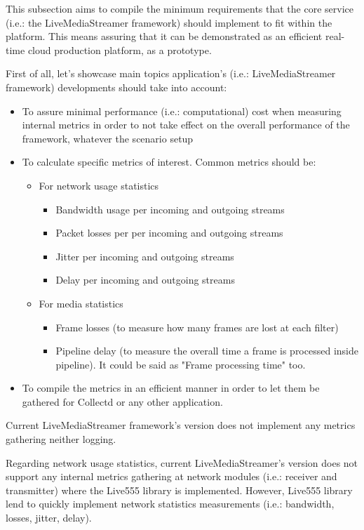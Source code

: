 This subsection aims to compile the minimum requirements that the core service (i.e.: the LiveMediaStreamer framework) should implement to fit within the platform. This means assuring that it can be demonstrated as an efficient real-time cloud production platform, as a prototype.

First of all, let's showcase main topics application's (i.e.: LiveMediaStreamer framework) developments should take into account:

\begin{itemize}
	\item To assure minimal performance (i.e.: computational) cost when measuring internal metrics in order to not take effect on the overall performance of the framework, whatever the scenario setup
	\item To calculate specific metrics of interest. Common metrics should be:
	\begin{itemize}
		\item For network usage statistics
		\begin{itemize}
			\item Bandwidth usage per incoming and outgoing streams
			\item Packet losses per per incoming and outgoing streams
			\item Jitter per incoming and outgoing streams
			\item Delay per incoming and outgoing streams
		\end{itemize}
		\item For media statistics
		\begin{itemize}
			\item Frame losses (to measure how many frames are lost at each filter)
			\item Pipeline delay (to measure the overall time a frame is processed inside pipeline). It could be said as "Frame processing time" too. 
		\end{itemize}
	\end{itemize}
	\item To compile the metrics in an efficient manner in order to let them be gathered for Collectd or any other application.
\end{itemize}

Current LiveMediaStreamer framework's version does not implement any metrics gathering neither logging.

Regarding network usage statistics, current LiveMediaStreamer's version does not support any internal metrics gathering at network modules (i.e.: receiver and transmitter) where the Live555 library is implemented. However, Live555 library lend to quickly implement network statistics measurements (i.e.: bandwidth, losses, jitter, delay). 

